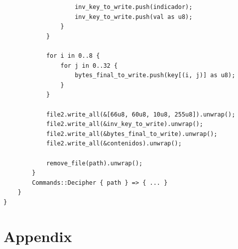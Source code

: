 \documentclass[a4paper]{article}
\begin{document}
\begin{verbatim}
                    inv_key_to_write.push(indicador);
                    inv_key_to_write.push(val as u8);
                }
            }

            for i in 0..8 {
                for j in 0..32 {
                    bytes_final_to_write.push(key[(i, j)] as u8);
                }
            }

            file2.write_all(&[66u8, 60u8, 10u8, 255u8]).unwrap();
            file2.write_all(&inv_key_to_write).unwrap();
            file2.write_all(&bytes_final_to_write).unwrap();
            file2.write_all(&contenidos).unwrap();

            remove_file(path).unwrap();
        }
        Commands::Decipher { path } => { ... }
    }
}
\end{verbatim}

\newpage
\section{Appendix}
\end{document}
